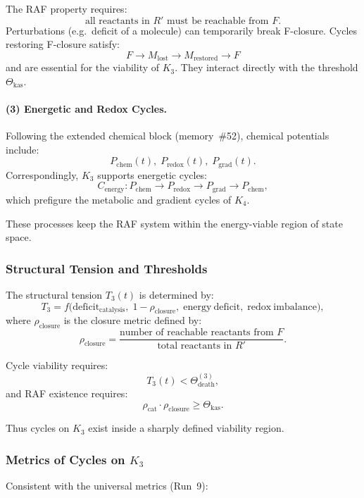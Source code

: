The RAF property requires:
\[
  \text{all reactants in } R' \text{ must be reachable from } F.
\]
Perturbations (e.g.\ deficit of a molecule) can temporarily break
F-closure.
Cycles restoring F-closure satisfy:
\[
  F \to M_{\mathrm{lost}} \to M_{\mathrm{restored}} \to F
\]
and are essential for the viability of $K_3$.
They interact directly with the threshold $\Theta_{\mathrm{kas}}$.

\paragraph{(3) Energetic and Redox Cycles.}

Following the extended chemical block (memory~\#52),
chemical potentials include:
\[
  P_{\mathrm{chem}}(t),\;
  P_{\mathrm{redox}}(t),\;
  P_{\mathrm{grad}}(t).
\]
Correspondingly, $K_3$ supports energetic cycles:
\[
  C_{\mathrm{energy}}: 
  P_{\mathrm{chem}}\to P_{\mathrm{redox}}
    \to P_{\mathrm{grad}} \to P_{\mathrm{chem}},
\]
which prefigure the metabolic and gradient cycles of $K_4$.

These processes keep the RAF system within the energy-viable region
of state space.

\subsubsection{Structural Tension and Thresholds}

The structural tension $T_3(t)$ is determined by:
\[
  T_3 = 
   f\bigl(
     \mathrm{deficit}_{\mathrm{catalysis}},\;
     1-\rho_{\mathrm{closure}},\;
     \mathrm{energy\ deficit},\;
     \mathrm{redox\ imbalance}
   \bigr),
\]
where $\rho_{\mathrm{closure}}$ is the closure metric defined by:
\[
  \rho_{\mathrm{closure}} =
    \frac{\text{number of reachable reactants from } F}
         {\text{total reactants in } R'}.
\]

Cycle viability requires:
\[
  T_3(t) < \Theta_{\mathrm{death}}^{(3)},
\]
and RAF existence requires:
\[
  \rho_{\mathrm{cat}} \cdot \rho_{\mathrm{closure}}
  \ge \Theta_{\mathrm{kas}}.
\]

Thus cycles on $K_3$ exist inside a sharply defined viability region.

\subsubsection{Metrics of Cycles on \texorpdfstring{$K_3$}{K_3}}

Consistent with the universal metrics (Run~9):


